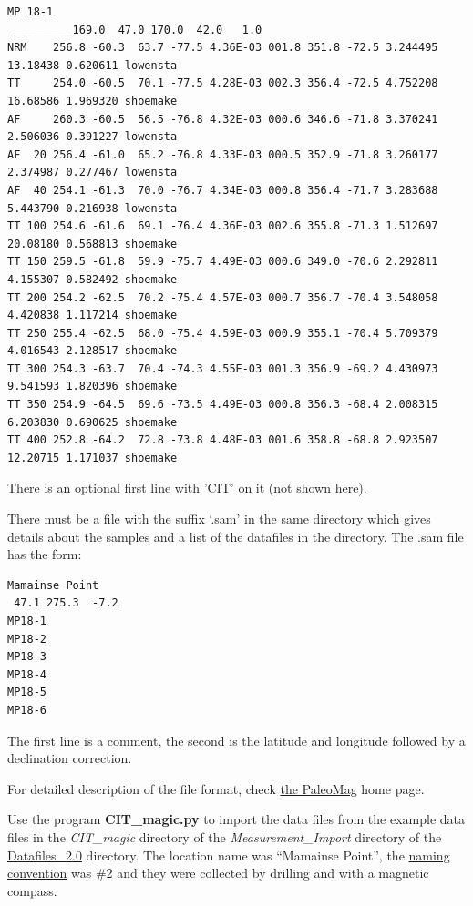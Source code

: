 \documentclass[11pt]{book}
\begin{document}
{{{\begin{verbatim}
MP 18-1 
 _________169.0  47.0 170.0  42.0   1.0
NRM    256.8 -60.3  63.7 -77.5 4.36E-03 001.8 351.8 -72.5 3.244495 13.18438 0.620611 lowensta 
TT     254.0 -60.5  70.1 -77.5 4.28E-03 002.3 356.4 -72.5 4.752208 16.68586 1.969320 shoemake 
AF     260.3 -60.5  56.5 -76.8 4.32E-03 000.6 346.6 -71.8 3.370241 2.506036 0.391227 lowensta 
AF  20 256.4 -61.0  65.2 -76.8 4.33E-03 000.5 352.9 -71.8 3.260177 2.374987 0.277467 lowensta 
AF  40 254.1 -61.3  70.0 -76.7 4.34E-03 000.8 356.4 -71.7 3.283688 5.443790 0.216938 lowensta 
TT 100 254.6 -61.6  69.1 -76.4 4.36E-03 002.6 355.8 -71.3 1.512697 20.08180 0.568813 shoemake 
TT 150 259.5 -61.8  59.9 -75.7 4.49E-03 000.6 349.0 -70.6 2.292811 4.155307 0.582492 shoemake 
TT 200 254.2 -62.5  70.2 -75.4 4.57E-03 000.7 356.7 -70.4 3.548058 4.420838 1.117214 shoemake 
TT 250 255.4 -62.5  68.0 -75.4 4.59E-03 000.9 355.1 -70.4 5.709379 4.016543 2.128517 shoemake 
TT 300 254.3 -63.7  70.4 -74.3 4.55E-03 001.3 356.9 -69.2 4.430973 9.541593 1.820396 shoemake 
TT 350 254.9 -64.5  69.6 -73.5 4.49E-03 000.8 356.3 -68.4 2.008315 6.203830 0.690625 shoemake 
TT 400 252.8 -64.2  72.8 -73.8 4.48E-03 001.6 358.8 -68.8 2.923507 12.20715 1.171037 shoemake 
\end{verbatim}

There is an optional first line with 'CIT' on it (not shown here).  

There must be a file with the suffix `.sam' in the same directory which gives details about the samples and a list of the datafiles in the directory.    The .sam file has the form:

\begin{verbatim}
Mamainse Point 
 47.1 275.3  -7.2
MP18-1                      
MP18-2                      
MP18-3                      
MP18-4                      
MP18-5                      
MP18-6 
\end{verbatim}

The first line is a comment, the second is the latitude and longitude followed by a declination correction. 

For detailed description of the file format, check \href{http://cires.colorado.edu/people/jones.craig/PMag3.html}{the PaleoMag} home page.   

Use the program {\bf CIT\_magic.py} to import the data files from the example data files in the {\it CIT\_magic} directory of the {\it Measurement\_Import} directory of the \href{#Datafiles}{Datafiles\_2.0} directory.   The location name was ``Mamainse Point'', the \href{#naming_schemes}{naming convention} was \#2 and they were collected by drilling and with a magnetic compass.  

}}}
\end{document}
